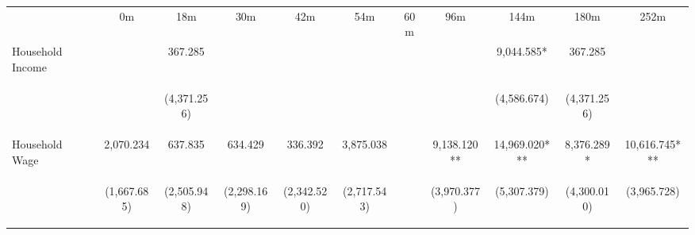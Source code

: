 \begin{tabular}{lcccccccccc}
\hline \noalign{\smallskip} & 0m & 18m & 30m & 42m & 54m & 60m & 96m & 144m & 180m & 252m\\
\noalign{\smallskip}\hline \noalign{\smallskip}Household Income &  & 367.285 &  &  &  &  &  & 9,044.585* & 367.285 & \\
 & \begin{footnotesize}\end{footnotesize} & \begin{footnotesize}(4,371.256)\end{footnotesize} & \begin{footnotesize}\end{footnotesize} & \begin{footnotesize}\end{footnotesize} & \begin{footnotesize}\end{footnotesize} & \begin{footnotesize}\end{footnotesize} & \begin{footnotesize}\end{footnotesize} & \begin{footnotesize}(4,586.674)\end{footnotesize} & \begin{footnotesize}(4,371.256)\end{footnotesize} & \begin{footnotesize}\end{footnotesize}\\
\noalign{\smallskip}Household Wage & 2,070.234 & 637.835 & 634.429 & 336.392 & 3,875.038 &  & 9,138.120** & 14,969.020*** & 8,376.289* & 10,616.745***\\
 & \begin{footnotesize}(1,667.685)\end{footnotesize} & \begin{footnotesize}(2,505.948)\end{footnotesize} & \begin{footnotesize}(2,298.169)\end{footnotesize} & \begin{footnotesize}(2,342.520)\end{footnotesize} & \begin{footnotesize}(2,717.543)\end{footnotesize} & \begin{footnotesize}\end{footnotesize} & \begin{footnotesize}(3,970.377)\end{footnotesize} & \begin{footnotesize}(5,307.379)\end{footnotesize} & \begin{footnotesize}(4,300.010)\end{footnotesize} & \begin{footnotesize}(3,965.728)\end{footnotesize}\\

\end{tabular}

